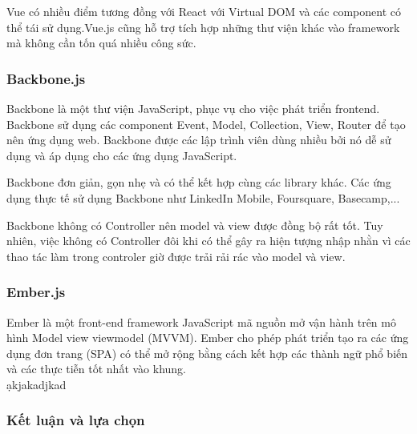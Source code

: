 Vue có nhiều điểm tương đồng với React với Virtual DOM và các component có thể tái sử dụng.Vue.js cũng hỗ trợ tích hợp những thư viện khác vào framework mà không cần tốn quá nhiều công sức.
\subsubsection{Backbone.js}
Backbone là một thư viện JavaScript, phục vụ cho việc phát triển frontend. Backbone sử dụng các component Event, Model, Collection, View, Router để tạo nên ứng dụng web. Backbone được các lập trình viên dùng nhiều bởi nó dễ sử dụng và áp dụng cho các ứng dụng JavaScript.

Backbone đơn giản, gọn nhẹ và có thể kết hợp cùng các library khác. Các ứng dụng thực tế sử dụng Backbone như LinkedIn Mobile, Foursquare, Basecamp,...

Backbone không có Controller nên model và view được đồng bộ rất tốt. Tuy nhiên, việc không có Controller đôi khi có thể gây ra hiện tượng nhập nhằn vì các thao tác làm trong controler giờ được trải rải rác vào model và view.
\subsubsection{Ember.js}
Ember là một front-end framework JavaScript mã nguồn mở vận hành trên mô hình Model view viewmodel (MVVM). Ember cho phép phát triển tạo ra các ứng dụng đơn trang (SPA) có thể mở rộng bằng cách kết hợp các thành ngữ phổ biến và các thực tiễn tốt nhất vào khung.\\
ạkjakadjkad

\subsubsection{Kết luận và lựa chọn}


